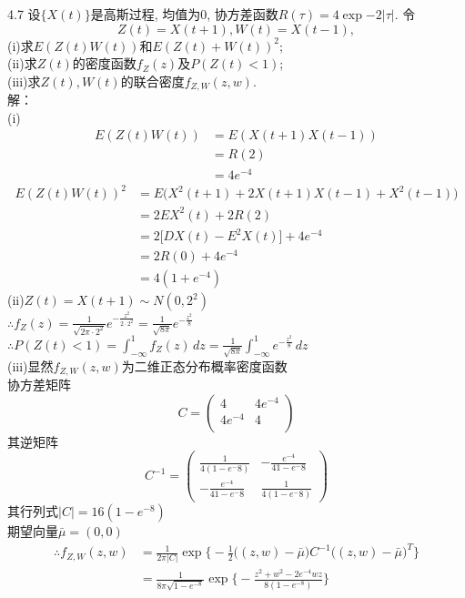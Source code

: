 4.7 设$\{X(t)\}$是高斯过程, 均值为$0$, 协方差函数$R(\tau) = 4\exp{-2|\tau|}$. 令
\[
Z(t) = X(t+1), W(t) = X(t-1),
\]
(i)求$E(Z(t)W(t))$和$E(Z(t) + W(t))^2$;\\
(ii)求$Z(t)$的密度函数$f_Z(z)$及$P(Z(t)<1)$;\\
(iii)求$Z(t), W(t)$的联合密度$f_{Z,W}(z,w)$.\\
解：\\
(i)
	\[
	\begin{split}
	E(Z(t)W(t)) & = E(X(t+1)X(t-1))\\
				& = R(2)\\
				& = 4e^{-4}
	\end{split}
	\]
	\[
	\begin{split}
	E(Z(t)W(t))^2 & = E\big(X^2(t+1)+2X(t+1)X(t-1)+X^2(t-1)\big)\\
				& = 2EX^2(t)+2R(2)\\
				& = 2\big[DX(t)-E^2X(t)\big] + 4e^{-4}\\
				& = 2R(0) + 4e^{-4}\\
				& = 4(1+e^{-4})
	\end{split}
	\]
	(ii)$Z(t) = X(t+1) \sim N(0, 2^2)$\\
	$\therefore f_Z(z) = \frac{1}{\sqrt{2\pi\cdot 2^2}}e^{-\frac{z^2}{2\cdot 2^2}} = \frac{1}{\sqrt{8\pi}}e^{-\frac{z^2}{8}}$\\
	$\therefore P(Z(t)<1) = \int^1_{-\infty}f_Z(z)\,dz = \frac{1}{\sqrt{8\pi}}\int^1_{-\infty}e^{-\frac{z^2}{8}}\,dz$\\
	(iii)显然$f_{Z,W}(z,w)$为二维正态分布概率密度函数\\
	协方差矩阵
	\[
	C=
	\begin{pmatrix}
	4 & 4e^{-4}\\
	4e^{-4} & 4\\
	\end{pmatrix}
	\]
	其逆矩阵
	\[
	C^{-1}=
	\begin{pmatrix}
	\frac{1}{4(1-e^-8)} & -\frac{e^{-4}}{4{1-e^-8}}\\
	-\frac{e^{-4}}{4{1-e^-8}} & \frac{1}{4(1-e^-8)} 
	\end{pmatrix}
	\]
	其行列式$\left|C\right| = 16(1-e^{-8})$\\
	期望向量$\bar \mu = (0,0)$\\
	\[
	\begin{split}
	\therefore f_{Z,W}(z,w) & = \frac{1}{2\pi\left|C\right|}\exp\Bigg\{-\frac{1}{2}\Big((z,w)-\bar \mu\Big)C^{-1}\Big((z,w)-\bar \mu\Big)^T\Bigg\}\\
							& = \frac{1}{8\pi\sqrt{1-e^{-8}}}\exp\Bigg\{-\frac{z^2+w^2-2e^{-4}wz}{8(1-e^{-8})}\Bigg\}
	\end{split}
	\]


